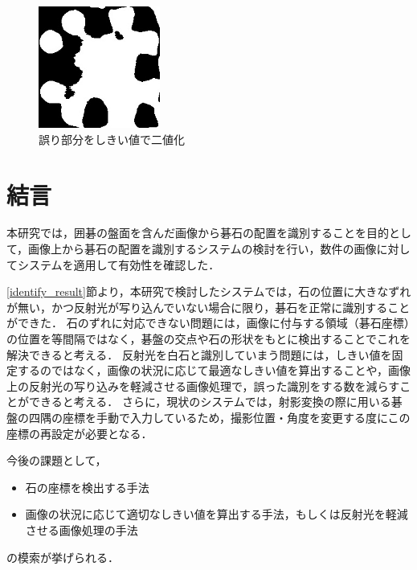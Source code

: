 \documentclass[openright]{nitocs}
\numberwithin{equation}{section}
\begin{document}
                \begin{figure}[tb] %
                    \begin{center}
                    \includegraphics[clip,width=40mm]{DSC_0098/TRIM_inRange_WHITE.jpg} 
                    \caption{誤り部分をしきい値で二値化}
                    \label{ex3_error_area}
                    \end{center}
                \end{figure}

    \section{結言}\label{sec:Item} %
        本研究では，囲碁の盤面を含んだ画像から碁石の配置を識別することを目的として，画像上から碁石の配置を識別するシステムの検討を行い，数件の画像に対してシステムを適用して有効性を確認した．

        \ref{identify_result}節より，本研究で検討したシステムでは，石の位置に大きなずれが無い，かつ反射光が写り込んでいない場合に限り，碁石を正常に識別することができた．
        石のずれに対応できない問題には，画像に付与する領域（碁石座標）の位置を等間隔ではなく，碁盤の交点や石の形状をもとに検出することでこれを解決できると考える．
        反射光を白石と識別していまう問題には，しきい値を固定するのではなく，画像の状況に応じて最適なしきい値を算出することや，画像上の反射光の写り込みを軽減させる画像処理で，誤った識別をする数を減らすことができると考える．
        さらに，現状のシステムでは，射影変換の際に用いる碁盤の四隅の座標を手動で入力しているため，撮影位置・角度を変更する度にこの座標の再設定が必要となる．

        今後の課題として，
        \begin{itemize}
            \item 石の座標を検出する手法
            \item 画像の状況に応じて適切なしきい値を算出する手法，もしくは反射光を軽減させる画像処理の手法
        \end{itemize}
        の模索が挙げられる．
\end{document}
